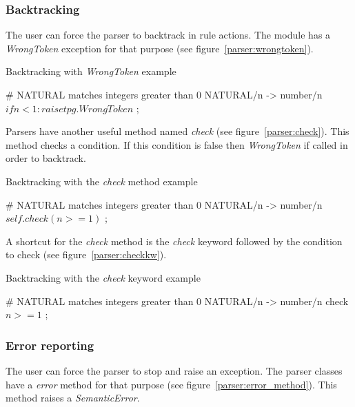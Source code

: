 \subsubsection{Backtracking}

The user can force the parser to backtrack in rule actions.
The module has a \emph{WrongToken} exception for that purpose (see figure~\ref{parser:wrongtoken}).

\begin{code}
\caption{Backtracking with \emph{WrongToken} example}           \label{parser:wrongtoken}
\begin{verbatimtab}[4]
	# NATURAL matches integers greater than 0
	NATURAL/n ->
		number/n
		$ if n<1: raise tpg.WrongToken $
		;
\end{verbatimtab}
\end{code}

Parsers have another useful method named \emph{check} (see figure~\ref{parser:check}).
This method checks a condition.
If this condition is false then \emph{WrongToken} if called in order to backtrack.

\begin{code}
\caption{Backtracking with the \emph{check} method example}		\label{parser:check}
\begin{verbatimtab}[4]
	# NATURAL matches integers greater than 0
	NATURAL/n ->
		number/n
		$ self.check(n>=1) $
		;
\end{verbatimtab}
\end{code}

A shortcut for the \emph{check} method is the \emph{check} keyword followed by the condition to check (see figure~\ref{parser:checkkw}).

\begin{code}
\caption{Backtracking with the \emph{check} keyword example}	\label{parser:checkkw}
\begin{verbatimtab}[4]
	# NATURAL matches integers greater than 0
	NATURAL/n ->
		number/n
		check $ n>=1 $
		;
\end{verbatimtab}
\end{code}

\subsubsection{Error reporting}

The user can force the parser to stop and raise an exception.
The parser classes have a \emph{error} method for that purpose (see figure~\ref{parser:error_method}).
This method raises a \emph{SemanticError}.

